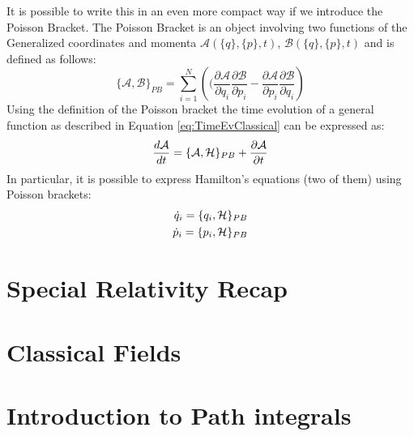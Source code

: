 It is possible to write this in an even more compact way if we introduce the Poisson Bracket. The Poisson Bracket is an object involving two functions of the Generalized coordinates and  momenta $\mathcal{A}(\{q\},\{p\},t)$, $\mathcal{B}(\{q\},\{p\},t)$ and is defined as follows:
\begin{equation}
    \{\mathcal{A},\mathcal{B}\}_{PB} = \sum_{i=1}^N\left((\frac{\partial\mathcal{A}}{\partial q_i}\frac{\partial \mathcal{B}}{\partial p_i} - \frac{\partial\mathcal{A}}{\partial p_i}\frac{\partial \mathcal{B}}{\partial q_i}\right)
    \label{eq:PoissonBracketdef}
\end{equation}
Using the definition of the Poisson bracket the time evolution of a general function as described in Equation \ref{eq:TimeEvClassical} can be expressed as:
\begin{equation}
    \frac{d\mathcal{A}}{dt} =   \{\mathcal{A},\mathcal{\mathcal{H}}\}_{PB} +\frac{\partial \mathcal{A}}{\partial t}
\end{equation}
In particular, it is possible to express Hamilton's equations (two of them) using Poisson brackets:
\begin{align}
    \dot q_i = \{q_i,\mathcal{H}\}_{PB}\\
    \dot p_i = \{p_i,\mathcal{H}\}_{PB}
\end{align}
\section{Special Relativity Recap}
\section{Classical Fields}
\section{Introduction to Path integrals}

